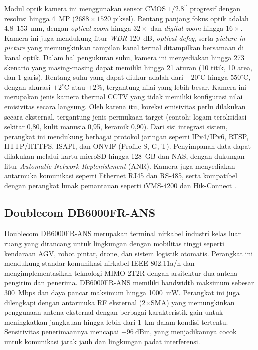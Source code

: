 Modul optik kamera ini menggunakan sensor CMOS \(1/2.8^{\prime\prime}\) progresif dengan resolusi hingga 4~MP (\(2688 \times 1520\) piksel). Rentang panjang fokus optik adalah 4{,}8--153~mm, dengan \emph{optical zoom} hingga \(32 \times\) dan \emph{digital zoom} hingga \(16 \times\). Kamera ini juga mendukung fitur \emph{WDR} 120~dB, \emph{optical defog}, serta \emph{picture-in-picture} yang memungkinkan tampilan kanal termal ditampilkan bersamaan di kanal optik. Dalam hal pengukuran suhu, kamera ini menyediakan hingga 273 skenario yang masing-masing dapat memiliki hingga 21 aturan (10 titik, 10 area, dan 1 garis). Rentang suhu yang dapat diukur adalah dari \(-20^\circ\text{C}\) hingga \(550^\circ\text{C}\), dengan akurasi \(\pm 2^\circ\text{C}\) atau \(\pm 2\%\), tergantung nilai yang lebih besar. Kamera ini merupakan jenis kamera thermal CCTV yang tidak memiliki konfigurasi nilai emisivitas secara langsung. Oleh karena itu, koreksi emisivitas perlu dilakukan secara eksternal, tergantung jenis permukaan target (contoh: logam teroksidasi sekitar 0{,}80, kulit manusia 0{,}95, keramik 0{,}90). Dari sisi integrasi sistem, perangkat ini mendukung berbagai protokol jaringan seperti IPv4/IPv6, RTSP, HTTP/HTTPS, ISAPI, dan ONVIF (Profile S, G, T). Penyimpanan data dapat dilakukan melalui kartu microSD hingga 128~GB dan NAS, dengan dukungan fitur \emph{Automatic Network Replenishment} (ANR). Kamera juga menyediakan antarmuka komunikasi seperti Ethernet RJ45 dan RS-485, serta kompatibel dengan perangkat lunak pemantauan seperti iVMS-4200 dan Hik-Connect \cite{hikmicro_hmptz}.


\subsection{Doublecom DB6000FR-ANS}

Doublecom DB6000FR-ANS merupakan terminal nirkabel industri kelas luar ruang yang dirancang untuk lingkungan dengan mobilitas tinggi seperti kendaraan AGV, robot pintar, drone, dan sistem logistik otomatis. Perangkat ini mendukung standar komunikasi nirkabel IEEE 802.11a/n dan mengimplementasikan teknologi MIMO 2T2R dengan arsitektur dua antena pengirim dan penerima. DB6000FR-ANS memiliki bandwidth maksimum sebesar 300~Mbps dan daya pancar maksimum hingga 1000~mW. Perangkat ini juga dilengkapi dengan antarmuka RF eksternal (2×SMA) yang memungkinkan penggunaan antena eksternal dengan berbagai karakteristik gain untuk meningkatkan jangkauan hingga lebih dari 1~km dalam kondisi tertentu. Sensitivitas penerimaannya mencapai \(-96~\text{dBm}\), yang menjadikannya cocok untuk komunikasi jarak jauh dan lingkungan padat interferensi.

